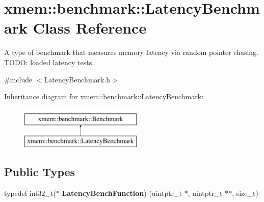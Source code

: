 \hypertarget{classxmem_1_1benchmark_1_1_latency_benchmark}{}\section{xmem\+:\+:benchmark\+:\+:Latency\+Benchmark Class Reference}
\label{classxmem_1_1benchmark_1_1_latency_benchmark}


A type of benchmark that measures memory latency via random pointer chasing. T\+O\+D\+O\+: loaded latency tests.  




{\ttfamily \#include $<$Latency\+Benchmark.\+h$>$}

Inheritance diagram for xmem\+:\+:benchmark\+:\+:Latency\+Benchmark\+:\begin{figure}[H]
\begin{center}
\leavevmode
\includegraphics[height=2.000000cm]{classxmem_1_1benchmark_1_1_latency_benchmark}
\end{center}
\end{figure}
\subsection*{Public Types}
\begin{DoxyCompactItemize}
\item 
\hypertarget{classxmem_1_1benchmark_1_1_latency_benchmark_aac378764f476152456a39c9eb1e06c29}{}typedef int32\+\_\+t($\ast$ {\bfseries Latency\+Bench\+Function}) (uintptr\+\_\+t $\ast$, uintptr\+\_\+t $\ast$$\ast$, size\+\_\+t)\label{classxmem_1_1benchmark_1_1_latency_benchmark_aac378764f476152456a39c9eb1e06c29}

\end{DoxyCompactItemize}
